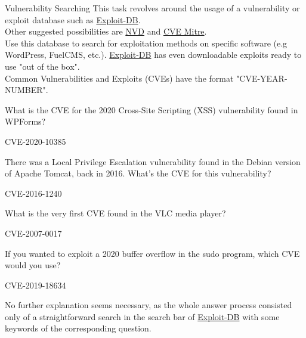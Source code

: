 \begin{task}{Vulnerability Searching}
This task revolves around the usage of a vulnerability or exploit database such as \href{https://www.exploit-db.com/}{Exploit-DB}.\\
Other suggested possibilities are \href{https://nvd.nist.gov/vuln/search}{NVD} and \href{https://cve.mitre.org/}{CVE Mitre}.\\
Use this database to search for exploitation methods on specific software (e.g WordPress, FuelCMS, etc.). \href{https://www.exploit-db.com/}{Exploit-DB} has even downloadable exploits ready to use "out of the box".\\
Common Vulnerabilities and Exploits (CVEs) have the format "CVE-YEAR-NUMBER".
\begin{question}
What is the CVE for the 2020 Cross-Site Scripting (XSS) vulnerability found in WPForms?
\end{question}
\begin{answer}
CVE-2020-10385
\end{answer}
\begin{question}
There was a Local Privilege Escalation vulnerability found in the Debian version of Apache Tomcat, back in 2016. What's the CVE for this vulnerability?
\end{question}
\begin{answer}
CVE-2016-1240
\end{answer}
\begin{question}
What is the very first CVE found in the VLC media player?
\end{question}
\begin{answer}
CVE-2007-0017
\end{answer}
\begin{question}
If you wanted to exploit a 2020 buffer overflow in the sudo program, which CVE would you use?
\end{question}
\begin{answer}
CVE-2019-18634
\end{answer}
No further explanation seems necessary, as the whole answer process consisted only of a straightforward search in the search bar of \href{https://www.exploit-db.com/}{Exploit-DB} with some keywords of the corresponding question.
\end{task}
